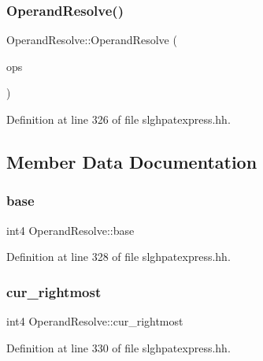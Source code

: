 \subsubsection{\texorpdfstring{OperandResolve()}{OperandResolve()}}
{\footnotesize\ttfamily Operand\+Resolve\+::\+Operand\+Resolve (\begin{DoxyParamCaption}\item[{vector$<$ \mbox{\hyperlink{class_operand_symbol}{Operand\+Symbol}} $\ast$ $>$ \&}]{ops }\end{DoxyParamCaption})\hspace{0.3cm}{\ttfamily [inline]}}



Definition at line 326 of file slghpatexpress.\+hh.



\subsection{Member Data Documentation}
\mbox{\label{struct_operand_resolve_af2b88c1af97c8931bc67720c8227979f}} 
\subsubsection{\texorpdfstring{base}{base}}
{\footnotesize\ttfamily int4 Operand\+Resolve\+::base}



Definition at line 328 of file slghpatexpress.\+hh.

\mbox{\label{struct_operand_resolve_aa639f62ee748da943545d268b5f1e428}} 
\subsubsection{\texorpdfstring{cur\_rightmost}{cur\_rightmost}}
{\footnotesize\ttfamily int4 Operand\+Resolve\+::cur\+\_\+rightmost}



Definition at line 330 of file slghpatexpress.\+hh.

\mbox{\label{struct_operand_resolve_a57727a1a11c802efc952f3e8f2297606}} 
